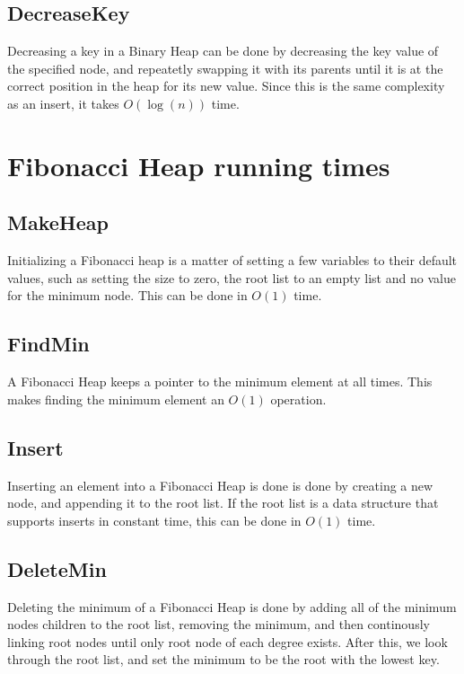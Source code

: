 \subsection{DecreaseKey}

Decreasing a key in a Binary Heap can be done by decreasing the key value of the specified node, and repeatetly swapping it with its parents until it is at the correct position in the heap for its new value. Since this is the same complexity as an insert, it takes $O(\log (n))$ time.


\section{Fibonacci Heap running times}

\subsection{MakeHeap}

Initializing a Fibonacci heap is a matter of setting a few variables to their default values, such as setting the size to zero, the root list to an empty list and no value for the minimum node. This can be done in $O(1)$ time.

\subsection{FindMin}

A Fibonacci Heap keeps a pointer to the minimum element at all times. This makes finding the minimum element an $O(1)$ operation.

\subsection{Insert}

Inserting an element into a Fibonacci Heap is done is done by creating a new node, and appending it to the root list. If the root list is a data structure that supports inserts in constant time, this can be done in $O(1)$ time.

\subsection{DeleteMin}

Deleting the minimum of a Fibonacci Heap is done by adding all of the minimum nodes children to the root list, removing the minimum, and then continously linking root nodes until only root node of each degree exists. After this, we look through the root list, and set the minimum to be the root with the lowest key.

